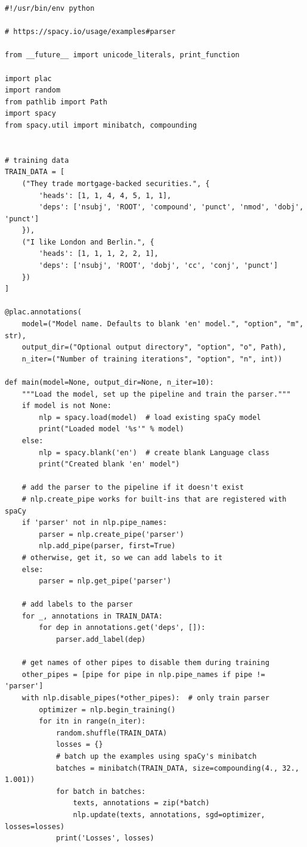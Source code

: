 \documentclass[12pt]{article}
\begin{document}
\begin{verbatim}
#!/usr/bin/env python

# https://spacy.io/usage/examples#parser

from __future__ import unicode_literals, print_function

import plac
import random
from pathlib import Path
import spacy
from spacy.util import minibatch, compounding


# training data
TRAIN_DATA = [
    ("They trade mortgage-backed securities.", {
        'heads': [1, 1, 4, 4, 5, 1, 1],
        'deps': ['nsubj', 'ROOT', 'compound', 'punct', 'nmod', 'dobj', 'punct']
    }),
    ("I like London and Berlin.", {
        'heads': [1, 1, 1, 2, 2, 1],
        'deps': ['nsubj', 'ROOT', 'dobj', 'cc', 'conj', 'punct']
    })
]

@plac.annotations(
    model=("Model name. Defaults to blank 'en' model.", "option", "m", str),
    output_dir=("Optional output directory", "option", "o", Path),
    n_iter=("Number of training iterations", "option", "n", int))

def main(model=None, output_dir=None, n_iter=10):
    """Load the model, set up the pipeline and train the parser."""
    if model is not None:
        nlp = spacy.load(model)  # load existing spaCy model
        print("Loaded model '%s'" % model)
    else:
        nlp = spacy.blank('en')  # create blank Language class
        print("Created blank 'en' model")

    # add the parser to the pipeline if it doesn't exist
    # nlp.create_pipe works for built-ins that are registered with spaCy
    if 'parser' not in nlp.pipe_names:
        parser = nlp.create_pipe('parser')
        nlp.add_pipe(parser, first=True)
    # otherwise, get it, so we can add labels to it
    else:
        parser = nlp.get_pipe('parser')

    # add labels to the parser
    for _, annotations in TRAIN_DATA:
        for dep in annotations.get('deps', []):
            parser.add_label(dep)

    # get names of other pipes to disable them during training
    other_pipes = [pipe for pipe in nlp.pipe_names if pipe != 'parser']
    with nlp.disable_pipes(*other_pipes):  # only train parser
        optimizer = nlp.begin_training()
        for itn in range(n_iter):
            random.shuffle(TRAIN_DATA)
            losses = {}
            # batch up the examples using spaCy's minibatch
            batches = minibatch(TRAIN_DATA, size=compounding(4., 32., 1.001))
            for batch in batches:
                texts, annotations = zip(*batch)
                nlp.update(texts, annotations, sgd=optimizer, losses=losses)
            print('Losses', losses)


\end{verbatim}
\end{document}
